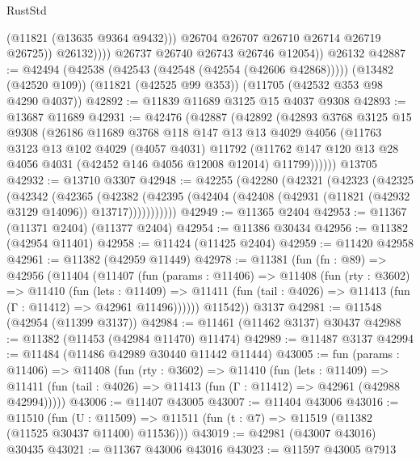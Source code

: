 \begin{lexlean}{RustStd}
\begin{coremodule}
                      (@11821 (@13635 @9364 @9432)))
                    @26704
                    @26707
                    @26710
                    @26714
                    @26719
                    @26725))
                @26132))))
        @26737
        @26740
        @26743
        @26746
        @12054))
    @26132
@42887 := @42494
    (@42538 (@42543 (@42548 (@42554 (@42606 @42868)))))
    (@13482 (@42520 @109))
    (@11821 (@42525 @99 @353))
    (@11705 (@42532 @353 @98 @4290 @4037))
@42892 := @11839 @11689 @3125 @15 @4037 @9308
@42893 := @13687 @11689
@42931 := @42476
    (@42887
      (@42892
        (@42893
          @3768
          @3125
          @15
          @9308
          (@26186
            @11689
            @3768
            @118
            @147
            @13
            @13
            @4029
            @4056
            (@11763
              @3123
              @13
              @102
              @4029
              (@4057 @4031)
              @11792
              (@11762 @147 @120 @13 @28 @4056 @4031 (@42452 @146 @4056 @12008 @12014) @11799))))))
    @13705
@42932 := @13710 @3307
@42948 := @42255
    (@42280
      (@42321
        (@42323
          (@42325
            (@42342
              (@42365
                (@42382
                  (@42395 (@42404 (@42408 (@42931 (@11821 (@42932 @3129 @14096)) @13717)))))))))))
@42949 := @11365 @2404
@42953 := @11367 (@11371 @2404) (@11377 @2404)
@42954 := @11386 @30434
@42956 := @11382 (@42954 @11401)
@42958 := @11424 (@11425 @2404)
@42959 := @11420 @42958
@42961 := @11382 (@42959 @11449)
@42978 := @11381
    (fun (fn : @89) =>
    @42956
      (@11404
        (@11407
          (fun (params : @11406) =>
          @11408
            (fun (rty : @3602) =>
            @11410
              (fun (lets : @11409) =>
              @11411 (fun (tail : @4026) => @11413 (fun (Γ : @11412) => @42961 @11496))))))
        @11542))
    @3137
@42981 := @11548 (@42954 (@11399 @3137))
@42984 := @11461 (@11462 @3137) @30437
@42988 := @11382 (@11453 (@42984 @11470) @11474)
@42989 := @11487 @3137
@42994 := @11484 (@11486 @42989 @30440 @11442 @11444)
@43005 := fun (params : @11406) =>
  @11408
    (fun (rty : @3602) =>
    @11410
      (fun (lets : @11409) =>
      @11411 (fun (tail : @4026) => @11413 (fun (Γ : @11412) => @42961 (@42988 @42994)))))
@43006 := @11407 @43005
@43007 := @11404 @43006
@43016 := @11510
    (fun (U : @11509) => @11511 (fun (t : @7) => @11519 (@11382 (@11525 @30437 @11400) @11536)))
@43019 := @42981 (@43007 @43016) @30435
@43021 := @11367 @43006 @43016
@43023 := @11597 @43005 @7913

\end{coremodule}
\end{lexlean}
